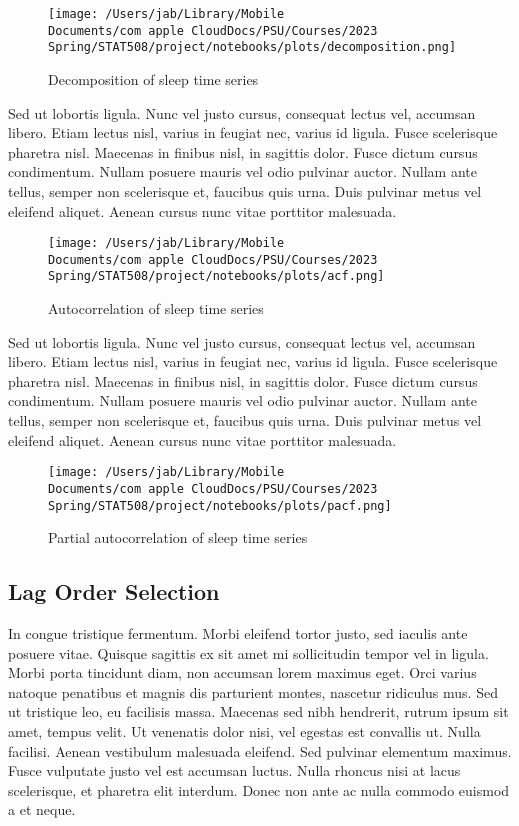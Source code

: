 \documentclass{article}
\begin{document}
\begin{figure}[!hp]
\centering
  \texttt{[image: /Users/jab/Library/Mobile Documents/com~apple~CloudDocs/PSU/Courses/2023 Spring/STAT508/project/notebooks/plots/decomposition.png]}
\caption{Decomposition of sleep time series}
\end{figure}

Sed ut lobortis ligula. Nunc vel justo cursus, consequat lectus vel,
accumsan libero. Etiam lectus nisl, varius in feugiat nec, varius id
ligula. Fusce scelerisque pharetra nisl. Maecenas in finibus nisl, in
sagittis dolor. Fusce dictum cursus condimentum. Nullam posuere mauris
vel odio pulvinar auctor. Nullam ante tellus, semper non scelerisque et,
faucibus quis urna. Duis pulvinar metus vel eleifend aliquet. Aenean
cursus nunc vitae porttitor malesuada.

\begin{figure}[!hp]
\centering
  \texttt{[image: /Users/jab/Library/Mobile Documents/com~apple~CloudDocs/PSU/Courses/2023 Spring/STAT508/project/notebooks/plots/acf.png]}
\caption{Autocorrelation of sleep time series}
\end{figure}

Sed ut lobortis ligula. Nunc vel justo cursus, consequat lectus vel,
accumsan libero. Etiam lectus nisl, varius in feugiat nec, varius id
ligula. Fusce scelerisque pharetra nisl. Maecenas in finibus nisl, in
sagittis dolor. Fusce dictum cursus condimentum. Nullam posuere mauris
vel odio pulvinar auctor. Nullam ante tellus, semper non scelerisque et,
faucibus quis urna. Duis pulvinar metus vel eleifend aliquet. Aenean
cursus nunc vitae porttitor malesuada.

\begin{figure}[!hp]
\centering
  \texttt{[image: /Users/jab/Library/Mobile Documents/com~apple~CloudDocs/PSU/Courses/2023 Spring/STAT508/project/notebooks/plots/pacf.png]}
\caption{Partial autocorrelation of sleep time series}
\end{figure}

\hypertarget{lag-order-selection}{%
\subsection{Lag Order Selection}\label{lag-order-selection}}

In congue tristique fermentum. Morbi eleifend tortor justo, sed iaculis
ante posuere vitae. Quisque sagittis ex sit amet mi sollicitudin tempor
vel in ligula. Morbi porta tincidunt diam, non accumsan lorem maximus
eget. Orci varius natoque penatibus et magnis dis parturient montes,
nascetur ridiculus mus. Sed ut tristique leo, eu facilisis massa.
Maecenas sed nibh hendrerit, rutrum ipsum sit amet, tempus velit. Ut
venenatis dolor nisi, vel egestas est convallis ut. Nulla facilisi.
Aenean vestibulum malesuada eleifend. Sed pulvinar elementum maximus.
Fusce vulputate justo vel est accumsan luctus. Nulla rhoncus nisi at
lacus scelerisque, et pharetra elit interdum. Donec non ante ac nulla
commodo euismod a et neque.
\end{document}
